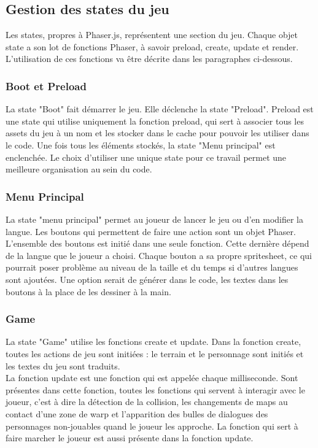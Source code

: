 \documentclass[11pt]{article}
\begin{document}
\subsection{Gestion des states du jeu}
Les states, propres à Phaser.js, représentent une section du jeu. Chaque objet state a son lot de fonctions Phaser, à savoir preload, create, update et render. L'utilisation de ces fonctions va être décrite dans les paragraphes ci-dessous.

\subsubsection{Boot et Preload}
La state "Boot" fait démarrer le jeu. Elle déclenche la state "Preload". Preload est une state qui utilise uniquement la fonction preload, qui sert à associer tous les assets du jeu à un nom et les stocker dans le cache pour pouvoir les utiliser dans le code. Une fois tous les éléments stockés, la state "Menu principal" est enclenchée. Le choix d'utiliser une unique state pour ce travail permet une meilleure organisation au sein du code.
\subsubsection{Menu Principal}
La state "menu principal" permet au joueur de lancer le jeu ou d'en modifier la langue. Les boutons qui permettent de faire une action sont un objet Phaser. L'ensemble des boutons est initié dans une seule fonction. Cette dernière dépend de la langue que le joueur a choisi. Chaque bouton a sa propre spritesheet, ce qui pourrait poser problème au niveau de la taille et du temps si d'autres langues sont ajoutées. Une option serait de générer dans le code, les textes dans les boutons à la place de les dessiner à la main.
\subsubsection{Game}
La state "Game" utilise les fonctions create et update. Dans la fonction create, toutes les actions de jeu sont initiées : le terrain et le personnage sont initiés et les textes du jeu sont traduits.
\\La fonction update est une fonction qui est appelée chaque milliseconde. Sont présentes dans cette fonction, toutes les fonctions qui servent à interagir avec le joueur, c'est à dire la détection de la collision, les changements de maps au contact d'une zone de warp et l'apparition des bulles de dialogues des personnages non-jouables quand le joueur les approche. La fonction qui sert à faire marcher le joueur est aussi présente dans la fonction update.
\end{document}
